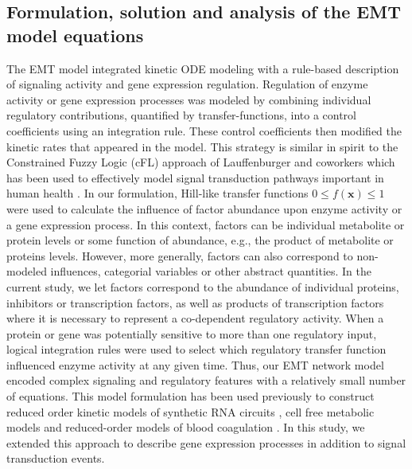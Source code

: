 \documentclass[11pt,letterpaper]{article}
\begin{document}
\subsection*{Formulation, solution and analysis of the EMT model equations}
The EMT model integrated kinetic ODE modeling with a rule-based description of signaling activity and gene expression regulation.
Regulation of enzyme activity or gene expression processes was modeled by combining individual regulatory contributions, quantified by transfer-functions,
into a control coefficients using an integration rule. These control coefficients then modified the kinetic rates that appeared in the model.
This strategy is similar in spirit to the Constrained Fuzzy Logic (cFL) approach of Lauffenburger and coworkers which has been used to effectively model signal transduction pathways important in human health \cite{Morris:2011ys}.
In our formulation, Hill-like transfer functions $0 \leq f\left(\mathbf{x}\right) \leq 1$ were used to calculate the influence of factor abundance upon enzyme activity or a gene expression process.
In this context, factors can be individual metabolite or protein levels or some function of abundance, e.g., the product of metabolite or proteins levels.
However, more generally, factors can also correspond to non-modeled influences, categorial variables or other abstract quantities.
In the current study, we let factors correspond to the abundance of individual proteins, inhibitors or transcription factors, as well as products of transcription factors where it is necessary to represent a co-dependent regulatory activity.
When a protein or gene was potentially sensitive to more than one regulatory input, logical integration rules were used to select
which regulatory transfer function influenced enzyme activity at any given time.
Thus, our EMT network model encoded complex signaling and regulatory features with a relatively small number of equations.
This model formulation has been used previously to construct reduced order kinetic models of synthetic RNA circuits \cite{Hu:2015aa},
cell free metabolic models \cite{pr3010138} and reduced-order models of blood coagulation \cite{pr3010178}.
In this study, we extended this approach to describe gene expression processes in addition to signal transduction events.
\end{document}
